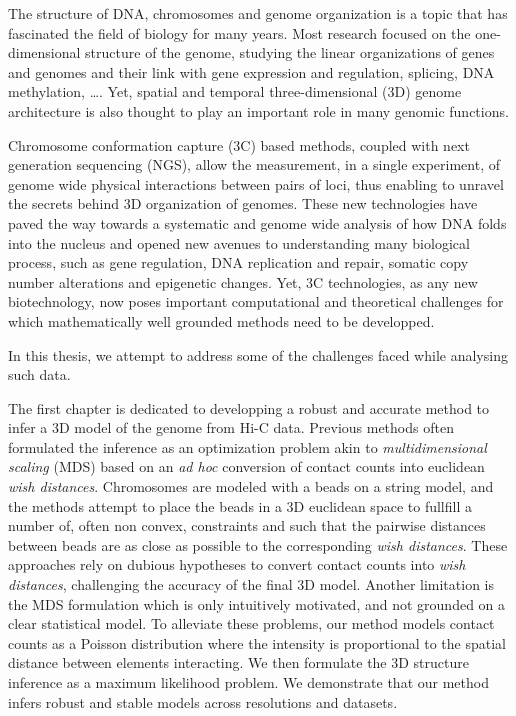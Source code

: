 


\begin{abstracts}        %

The structure of DNA, chromosomes and genome organization is a topic that has
fascinated the field of biology for many years. Most research focused on the
one-dimensional structure of the genome, studying the linear organizations of
genes and genomes and their link with gene expression and regulation,
splicing, DNA methylation, \dots. Yet, spatial and temporal three-dimensional
(3D) genome architecture is also thought to play an important role in many
genomic functions.

Chromosome conformation capture (3C) based methods, coupled with next
generation sequencing (NGS), allow the measurement, in a single experiment, of
genome wide physical interactions between pairs of loci, thus enabling to
unravel the secrets behind 3D organization of genomes. These new technologies
have paved the way towards a systematic and genome wide analysis of how DNA
folds into the nucleus and opened new avenues to understanding many biological
process, such as gene regulation, DNA replication and repair, somatic copy
number alterations and epigenetic changes. Yet, 3C technologies, as any new
biotechnology, now poses important computational and theoretical challenges
for which mathematically well grounded methods need to be developped.

In this thesis, we attempt to address some of the challenges faced while
analysing such data.

The first chapter is dedicated to developping a robust and accurate method to
infer a 3D model of the genome from Hi-C data. Previous methods often
formulated the inference as an optimization problem akin to {\em
multidimensional scaling } (MDS) based on an {\em ad hoc} conversion of
contact counts into euclidean {\em wish distances}. Chromosomes are modeled
with a beads on a string model, and the methods attempt to place the beads in
a 3D euclidean space to fullfill a number of, often non convex, constraints
and such that the pairwise distances between beads are as close as possible
to the corresponding {\em wish distances}. These approaches rely on dubious
hypotheses to convert contact counts into {\em wish distances}, challenging
the accuracy of the final 3D model. Another limitation is the MDS formulation
which is only intuitively motivated, and not grounded on a clear statistical
model. To alleviate these problems, our method models contact counts as a
Poisson distribution where the
intensity is proportional to the spatial distance between elements
interacting. We then formulate the 3D structure inference as a maximum
likelihood problem. We demonstrate that our method infers robust and stable
models across resolutions and datasets.


\end{abstracts}
